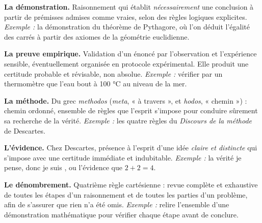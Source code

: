 \documentclass[11pt]{article}
\newcommand{\cle}[1]{{\popxbold\color{popdark}#1}}
\begin{document}
\begin{corrige}
\textbf{La \cle{démonstration}.} Raisonnement qui établit \emph{nécessairement} une conclusion à partir de prémisses admises comme vraies, selon des règles logiques explicites. \emph{Exemple :} la démonstration du théorème de Pythagore, où l'on déduit l'égalité des carrés à partir des axiomes de la géométrie euclidienne.

\textbf{La \cle{preuve empirique}.} Validation d'un énoncé par l'observation et l'expérience sensible, éventuellement organisée en protocole expérimental. Elle produit une certitude \cle{probable} et \cle{révisable}, non absolue. \emph{Exemple :} vérifier par un thermomètre que l'eau bout à 100 °C au niveau de la mer.

\textbf{La \cle{méthode}.} Du grec \emph{methodos} (\emph{meta}, « à travers », et \emph{hodos}, « chemin ») : chemin ordonné, ensemble de règles que l'esprit s'impose pour conduire sûrement sa recherche de la vérité. \emph{Exemple :} les quatre règles du \emph{Discours de la méthode} de Descartes.

\textbf{L'\cle{évidence}.} Chez Descartes, présence à l'esprit d'une idée \emph{claire et distincte} qui s'impose avec une certitude immédiate et indubitable. \emph{Exemple :} la vérité \guillemotleft je pense, donc je suis \guillemotright, ou l'évidence que $2 + 2 = 4$.

\textbf{Le \cle{dénombrement}.} Quatrième règle cartésienne : revue complète et exhaustive de toutes les étapes d'un raisonnement et de toutes les parties d'un problème, afin de s'assurer que rien n'a été omis. \emph{Exemple :} relire l'ensemble d'une démonstration mathématique pour vérifier chaque étape avant de conclure.
\end{corrige}
\end{document}
